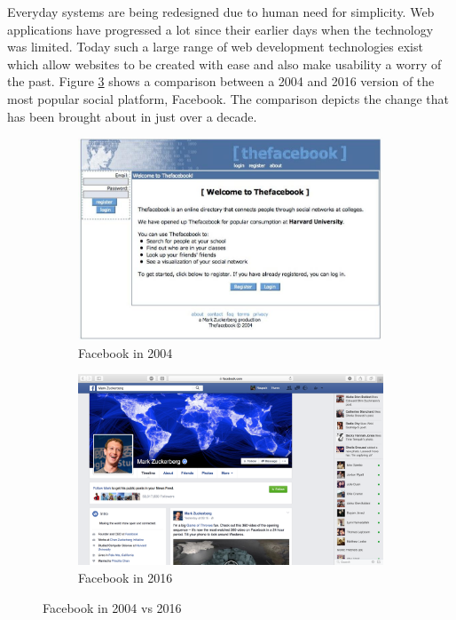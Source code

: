 Everyday systems are being redesigned due to human need for simplicity. Web applications have progressed a lot since their earlier days when the technology was limited. Today such a large range of web development technologies exist which allow websites to be created with ease and also make usability a worry of the past. Figure \ref{fig:Facebook_Changes} shows a comparison between a 2004 and 2016 version of the most popular social platform, Facebook. The comparison depicts the change that has been brought about in just over a decade.

\begin{figure}[H]
	\centering
	\begin{subfigure}[t]{0.45\textwidth}
		\centering
		\includegraphics[width=1.0\textwidth]{images/Facebook_2004}
		\caption{Facebook in 2004}\label{fig:Facebook_2004}		
	\end{subfigure}
	\quad
	\begin{subfigure}[t]{0.45\textwidth}
		\centering
		\includegraphics[width=1.0\textwidth]{images/Facebook_2016}
		\caption{Facebook in 2016}\label{fig:Facebook_2016}
	\end{subfigure}
	\caption{Facebook in 2004 vs 2016}\label{fig:Facebook_Changes}
\end{figure}

